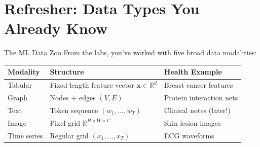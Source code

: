 \documentclass[aspectratio=169,10pt]{beamer}
\begin{document}
\section{Refresher: Data Types You Already Know}

\begin{frame}{The ML Data Zoo}
From the labs, you've worked with five broad data modalities:

\vspace{0.4em}
\begin{center}
\begin{tabular}{lll}
\toprule
\textbf{Modality} & \textbf{Structure} & \textbf{Health Example} \\
\midrule
Tabular & Fixed-length feature vector $\mathbf{x} \in \mathbb{R}^d$ & Breast cancer features \\
Graph & Nodes + edges $(V, E)$ & Protein interaction nets \\
Text & Token sequence $(w_1, \ldots, w_T)$ & Clinical notes (later!) \\
Image & Pixel grid $\mathbb{R}^{H \times W \times C}$ & Skin lesion images \\
Time series & Regular grid $(x_1, \ldots, x_T)$ & ECG waveforms \\
\bottomrule
\end{tabular}
\end{center}

\end{frame}
\end{document}
